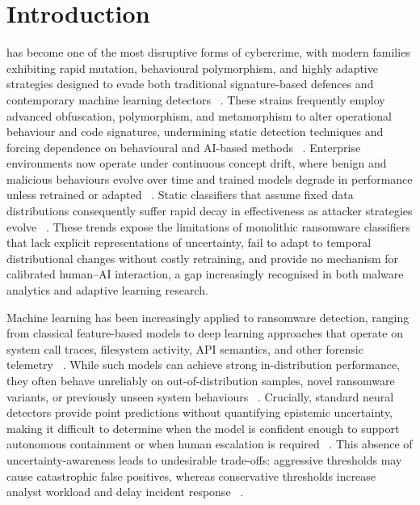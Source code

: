 \documentclass[lettersize,journal]{IEEEtran}
\begin{document}
\section{Introduction}
\label{sec:introduction}

 has become one of the most disruptive forms of cybercrime, with modern families exhibiting rapid mutation, behavioural polymorphism, and highly adaptive strategies designed to evade both traditional signature-based defences and contemporary machine learning detectors ~\cite{fernando2020study, razaulla2023age}. These strains frequently employ advanced obfuscation, polymorphism, and metamorphism to alter operational behaviour and code signatures, undermining static detection techniques and forcing dependence on behavioural and AI-based methods ~\cite{fernando2020study, Urooj2024polymorphism}. Enterprise environments now operate under continuous concept drift, where benign and malicious behaviours evolve over time and trained models degrade in performance unless retrained or adapted ~\cite{Ceschin2022ConceptDrift}. Static classifiers that assume fixed data distributions consequently suffer rapid decay in effectiveness as attacker strategies evolve ~\cite{Fernando2024FeSAD, razaulla2023age}. These trends expose the limitations of monolithic ransomware classifiers that lack explicit representations of uncertainty, fail to adapt to temporal distributional changes without costly retraining, and provide no mechanism for calibrated human–AI interaction, a gap increasingly recognised in both malware analytics and adaptive learning research.

Machine learning has been increasingly applied to ransomware detection, ranging from classical feature-based models to deep learning approaches that operate on system call traces, filesystem activity, API semantics, and other forensic telemetry ~\cite{alraizza2023ransomware, zahoora2022Deep}. While such models can achieve strong in-distribution performance, they often behave unreliably on out-of-distribution samples, novel ransomware variants, or previously unseen system behaviours ~\cite{fernando2020study}. Crucially, standard neural detectors provide point predictions without quantifying epistemic uncertainty, making it difficult to determine when the model is confident enough to support autonomous containment or when human escalation is required ~\cite{Doan2024uncertainBay}. This absence of uncertainty-awareness leads to undesirable trade-offs: aggressive thresholds may cause catastrophic false positives, whereas conservative thresholds increase analyst workload and delay incident response ~\cite{Ispahany2024Survey}.
\end{document}
